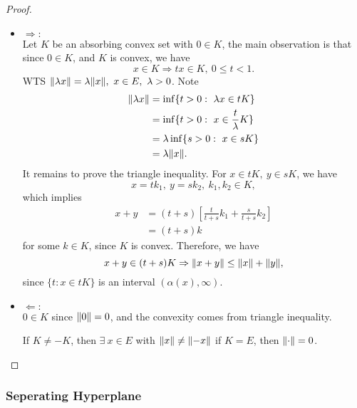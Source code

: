 \begin{proof}\ \\
\begin{itemize}
    \item $\Rightarrow:$\\
    Let $K$ be an absorbing convex set with $0 \in K$, the main observation is that since $0 \in K$, and $K$ is convex, we have
    \begin{equation*}
        x \in K \Rightarrow tx \in K,\ 0 \leq t < 1.
    \end{equation*}
    WTS $\norm{\lambda x} = \lambda \norm{x},\ x \in E,\ \lambda > 0$. Note
    \begin{align*}
        \norm{\lambda x} &= \inf\{t > 0:\ \lambda x \in tK\}\\
        &= \inf\{t > 0:\ x \in \frac{t}{\lambda} K\}\\
        &= \lambda \inf\{s > 0:\ x \in sK\}\\
        &= \lambda \norm{x}.
    \end{align*}
    It remains to prove the triangle inequality. For $x\in tK,\ y \in sK$, we have 
    \begin{equation*}
        x = tk_1,\ y = sk_2,\ k_1,k_2 \in K,
    \end{equation*}
which implies
\begin{align*}
    x + y &= (t + s) [\frac{t}{t+s} k_1 + \frac{s}{t+s} k_2]\\
    &= (t+s) k
\end{align*}
for some $k \in K$, since $K$ is convex. Therefore, we have
\begin{equation*}
    x + y \in (t+s)K \Rightarrow \norm{x + y} \leq \norm{x} + \norm{y},
\end{equation*}
since $\{t: x \in tK\}$ is an interval $(\alpha(x), \infty)$.
\item $\Leftarrow:$\\
$0 \in K$ since $\norm{0} = 0$, and the convexity comes from triangle inequality.\\
\begin{remark}
If $K \neq -K$, then $\exists\ x \in E$ with $\norm{x} \neq \norm{-x}$ if $K = E$, then $\norm{\cdot} = 0$.
\end{remark}
\end{itemize}
\end{proof}


\subsubsection{Seperating Hyperplane}

